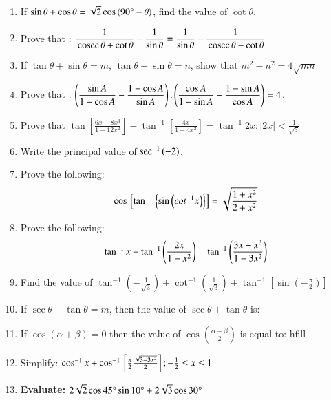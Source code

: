 \begin{enumerate}[label=\thesubsection.\arabic*.,ref=\thesubsection.\theenumi]
\hfill{}
\item If $\sin\theta+\cos\theta=\sqrt{2}\cos\left(90\degree{}-\theta\right)$, find the value of $\cot\theta$.
\hfill{}\item Prove that : $\dfrac{1}{\,\text{cosec}\,\theta+\cot\theta}-\dfrac{1}{\sin\theta}=\dfrac{1}{\sin\theta}-\dfrac{1}{\,\text{cosec}\,\theta-\cot\theta}$
\hfill{}\item If $\tan\theta+\sin\theta=m$, $\tan\theta-\sin\theta=n$, show that $m^{2}-n^{2}=4\sqrt{mn}$
\hfill{}\item Prove that : $\left(\dfrac{\sin A}{1-\cos A}-\dfrac{1-\cos A}{\sin A}\right).\left(\dfrac{\cos A}{1-\sin A}-\dfrac{1-\sin A}{\cos A}\right)=4$.
\hfill{}
\item Prove that $\tan[\frac{6x-8x^3}{1-12x^2}]-\tan^{-1}[\frac{4x}{1-4x^2}]=\tan^{-1}2x:|2x|<\frac{1}{\sqrt{3}}$
\hfill{}

\item Write the principal value of $\sec^{-1} \left(-2\right)$.

\hfill{}\item Prove the following:
    \begin{align*}
        \cos {}\left[\tan^{-1} \left\{\sin \left(cot^{-1} x\right)\right\}\right] = \sqrt{\frac{1 + x^2}{2 + x^2}}
    \end{align*}

\hfill{}\item Prove the following:
    \begin{align*}
        \tan^{-1} x + \tan^{-1} \left(\frac{2x}{1 - x^2}\right) = \tan^{-1} \left(\frac{3x - x^3}{1 - 3x^2}\right)
    \end{align*}
\hfill{}

\item Find the value of $\tan^{-1} (-\frac{1}{\sqrt{3}}) + \cot^{-1}(\frac{1}{\sqrt{3}}) + \tan^{-1}[\sin(-\frac{\pi}{2})]$
	 \hfill{}
\item If $\sec\theta - \tan\theta = m$, then the value of $\sec\theta + \tan\theta$ is:

 \hfill{}\item If $\cos(\alpha + \beta) = 0$ then the value of $\cos\left(\frac{\alpha + \beta}{2}\right)$ is equal to:
hfill

\item Simplify: $\cos^{-1}x + \cos^{-1}{}\left[\frac{x}{2}{\frac{\sqrt{3-3x^2}}{2}}\right];-\frac{1}{2} \leq x \leq 1$

\hfill{}\item\textbf{ Evaluate:} $2\sqrt{2} \cos 45\degree \sin 10\degree + 2\sqrt{3} \cos 30\degree$


\end{enumerate}
